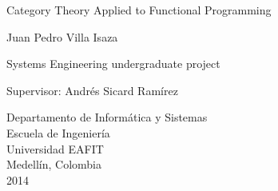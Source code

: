 \begin{titlepage}

  \begin{center}

    {\LARGE Category Theory Applied to Functional Programming}

    \vspace*{\fill}

    {\large Juan Pedro Villa Isaza}

    \vspace*{\fill}

    {\large Systems Engineering undergraduate project}

    \vspace*{\fill}

    {\large Supervisor:}
    {\large Andrés Sicard Ramírez}

    \vspace*{\fill}

    {\large Departamento de Informática y Sistemas}\\
    {\large Escuela de Ingeniería}\\
    {\large Universidad EAFIT}\\
    {\large Medellín, Colombia}\\
    {\large 2014}

  \end{center}

\end{titlepage}

\clearemptydoublepage
